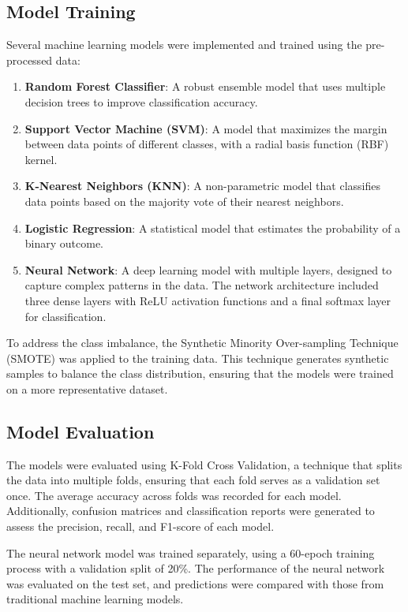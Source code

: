 \documentclass[a4paper,12pt]{Classes/RoboticsLaTeX}
\begin{document}
\begin{abstracts}
\subsection{Model Training}

Several machine learning models were implemented and trained using the pre-processed data:

\begin{enumerate}
    \item \textbf{Random Forest Classifier}: A robust ensemble model that uses multiple decision trees to improve classification accuracy.
    \item \textbf{Support Vector Machine (SVM)}: A model that maximizes the margin between data points of different classes, with a radial basis function (RBF) kernel.
    \item \textbf{K-Nearest Neighbors (KNN)}: A non-parametric model that classifies data points based on the majority vote of their nearest neighbors.
    \item \textbf{Logistic Regression}: A statistical model that estimates the probability of a binary outcome.
    \item \textbf{Neural Network}: A deep learning model with multiple layers, designed to capture complex patterns in the data. The network architecture included three dense layers with ReLU activation functions and a final softmax layer for classification.
\end{enumerate}

To address the class imbalance, the Synthetic Minority Over-sampling Technique (SMOTE) was applied to the training data. This technique generates synthetic samples to balance the class distribution, ensuring that the models were trained on a more representative dataset.

\subsection{Model Evaluation}

The models were evaluated using K-Fold Cross Validation, a technique that splits the data into multiple folds, ensuring that each fold serves as a validation set once. The average accuracy across folds was recorded for each model. Additionally, confusion matrices and classification reports were generated to assess the precision, recall, and F1-score of each model.

The neural network model was trained separately, using a 60-epoch training process with a validation split of 20\%. The performance of the neural network was evaluated on the test set, and predictions were compared with those from traditional machine learning models.


\end{abstracts}
\end{document}
